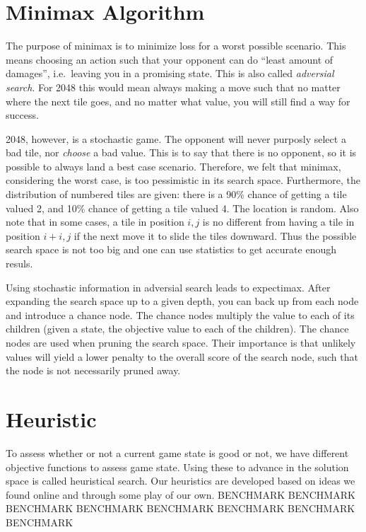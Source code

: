 \documentclass[journal]{IEEEtran}
\begin{document}
\section*{Minimax Algorithm}
The purpose of minimax is to minimize loss for a worst possible scenario.
This means choosing an action such that your opponent can do ``least amount of damages'',
i.e.\ leaving you in a promising state. This is also called \textit{adversial search}.
For 2048 this would mean always making a move such that no matter where the next
tile goes, and no matter what value, you will still find a way for success.


2048, however, is a stochastic game. The opponent will never purposly select a
bad tile, nor \textit{choose} a bad value. This is to say that there is no opponent,
so it is possible to always land a best case scenario. Therefore, we felt that minimax,
considering the worst case, is too pessimistic in its search space.
Furthermore, the distribution of numbered tiles are given:
there is a 90\% chance of getting a tile valued 2, and 10\% chance of getting a tile
valued 4. The location is random. Also note that in some cases, a tile
in position $i,j$  is no different from having a tile in position $i+i,j$ if the
next move it to slide the tiles downward. Thus the possible search space
is not too big and one can use statistics to get accurate enough resuls.


Using stochastic information in adversial search leads to expectimax.
After expanding the search space up to a given depth, you can back up from each
node and introduce a chance node. The chance nodes multiply the value to each
of its children (given a state, the objective value to each of the children).
The chance nodes are used when pruning the search space. Their importance is that
unlikely values will yield a lower penalty to the overall score of the search node,
such that the node is not necessarily pruned away.

\section*{Heuristic}
To assess whether or not a current game state is good or not, we have different
objective functions to assess game state. Using these to advance in the
solution space is called heuristical search. Our heuristics are developed based
on ideas we found online and through some play of our own.
BENCHMARK
BENCHMARK
BENCHMARK
BENCHMARK
BENCHMARK
BENCHMARK
BENCHMARK
BENCHMARK
\end{document}
